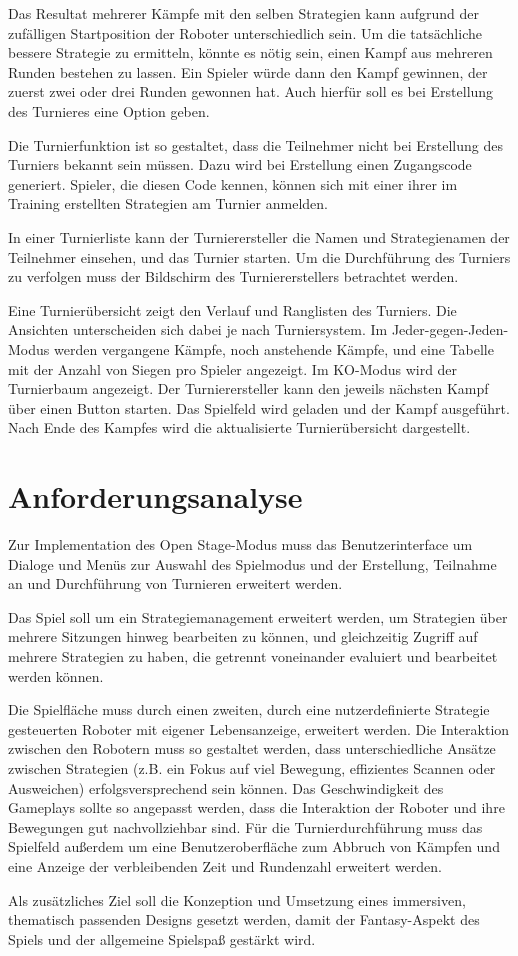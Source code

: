 Das Resultat mehrerer Kämpfe mit den selben Strategien kann aufgrund der zufälligen Startposition
der Roboter unterschiedlich sein. Um die tatsächliche bessere Strategie zu ermitteln, könnte es
nötig sein, einen Kampf aus mehreren Runden bestehen zu lassen. Ein Spieler würde dann den Kampf
gewinnen, der zuerst zwei oder drei Runden gewonnen hat. Auch hierfür soll es bei Erstellung des
Turnieres eine Option geben.

Die Turnierfunktion ist so gestaltet, dass die Teilnehmer nicht bei Erstellung des Turniers bekannt
sein müssen. Dazu wird bei Erstellung einen Zugangscode generiert. Spieler, die diesen Code kennen,
können sich mit einer ihrer im Training erstellten Strategien am Turnier anmelden.

In einer Turnierliste kann der Turnierersteller die Namen und Strategienamen der Teilnehmer
einsehen, und das Turnier starten. Um die Durchführung des Turniers zu verfolgen muss der Bildschirm
des Turniererstellers betrachtet werden.

Eine Turnierübersicht zeigt den Verlauf und Ranglisten des Turniers. Die Ansichten unterscheiden
sich dabei je nach Turniersystem. Im Jeder-gegen-Jeden-Modus werden vergangene Kämpfe, noch
anstehende Kämpfe, und eine Tabelle mit der Anzahl von Siegen pro Spieler angezeigt. Im KO-Modus
wird der Turnierbaum angezeigt. Der Turnierersteller kann den jeweils nächsten Kampf über einen
Button starten. Das Spielfeld wird geladen und der Kampf ausgeführt. Nach Ende des Kampfes wird die
aktualisierte Turnierübersicht dargestellt.


\section{Anforderungsanalyse}

Zur Implementation des Open Stage-Modus muss das Benutzerinterface um Dialoge und Menüs zur Auswahl
des Spielmodus und der Erstellung, Teilnahme an und Durchführung von Turnieren erweitert werden.

Das Spiel soll um ein Strategiemanagement erweitert werden, um Strategien über mehrere Sitzungen
hinweg bearbeiten zu können, und gleichzeitig Zugriff auf mehrere Strategien zu haben, die getrennt
voneinander evaluiert und bearbeitet werden können.

Die Spielfläche muss durch einen zweiten, durch eine nutzerdefinierte Strategie gesteuerten Roboter
mit eigener Lebensanzeige, erweitert werden. Die Interaktion zwischen den Robotern muss so gestaltet
werden, dass unterschiedliche Ansätze zwischen Strategien (z.B. ein Fokus auf viel Bewegung,
effizientes Scannen oder Ausweichen) erfolgsversprechend sein können. Das Geschwindigkeit des
Gameplays sollte so angepasst werden, dass die Interaktion der Roboter und ihre Bewegungen gut
nachvollziehbar sind. Für die Turnierdurchführung muss das Spielfeld außerdem um eine
Benutzeroberfläche zum Abbruch von Kämpfen und eine Anzeige der verbleibenden Zeit und Rundenzahl
erweitert werden. 

Als zusätzliches Ziel soll die Konzeption und Umsetzung eines immersiven, thematisch passenden
Designs gesetzt werden, damit der Fantasy-Aspekt des Spiels und der allgemeine Spielspaß gestärkt
wird.
